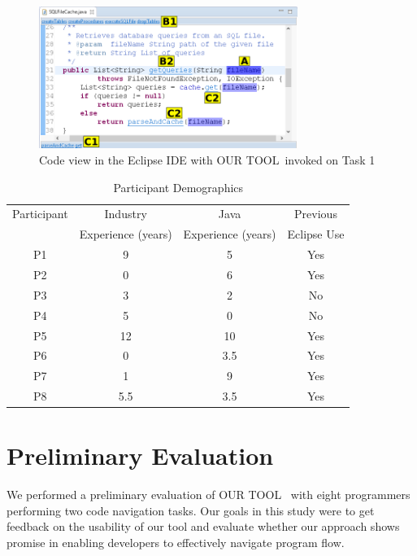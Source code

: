 \documentclass[conference]{IEEEtran}
\newcommand{\toolName}{OUR TOOL}
\begin{document}
\begin{figure}
	\centering
	\includegraphics[width=0.75\textwidth]{images/toolScreenshot}
	\caption{Code view in the Eclipse IDE with \toolName~invoked on Task 1}	
	\label{fig:tool} 
\end{figure}


\begin{table}
\centering
\caption{Participant Demographics}
\begin{tabular}{|c|c|c|c|}
\hline
Participant & Industry & Java &\multicolumn{1}{c|}{Previous} \\
& Experience (years) & Experience (years) & \multicolumn{1}{c|}{Eclipse Use} \\
\hline
P1 & 9 & 5 & Yes \\
\hline
P2 & 0 & 6 & Yes \\
\hline
P3 & 3 & 2 & No \\
\hline
P4 & 5 & 0 & No \\
\hline
P5 & 12 & 10 & Yes \\
\hline
P6 & 0 & 3.5 & Yes \\
\hline
P7 & 1 & 9 & Yes \\
\hline
P8 & 5.5 & 3.5 & Yes \\
\hline
\end{tabular}
\label{table:participants}
\end{table}

\section{Preliminary Evaluation}
We performed a preliminary evaluation of \toolName~ with eight programmers performing two code navigation tasks.
Our goals in this study were to get feedback on the usability of our tool and evaluate whether our approach shows promise in enabling developers to effectively navigate program flow. 
\end{document}
